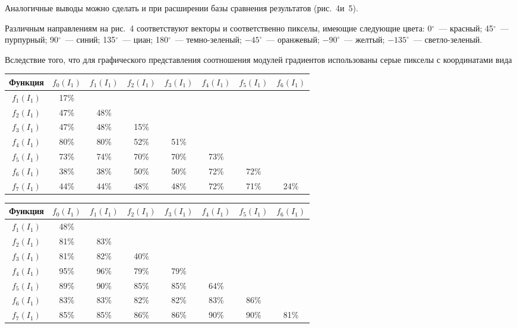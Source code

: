 \begin{multicols}{2}
  Аналогичные выводы можно сделать и при расширении базы сравнения
результатов (рис.~4\linebreak и~5).

  Различным направлениям на рис.~4 соответствуют векторы и соответственно
пикселы, имеющие следующие цвета: 0$^\circ$~--- красный; 45$^\circ$~---
пурпурный; 90$^\circ$~--- синий; 135$^\circ$~--- циан; 180$^\circ$~---
  тем\-но-зе\-ле\-ный; $-45^\circ$~--- оранжевый; $-90^\circ$~--- желтый; $-
135^\circ$~--- свет\-ло-зе\-леный.

  Вследствие того, что для графического пред\-став\-ле\-ния соотношения модулей
градиентов использованы серые пикселы с координатами вида

  \begin{table*}[b]\small %
  \begin{center}
  \vspace*{2ex}

  \begin{tabular}{|c|c|c|c|c|c|c|c|}
  \hline
\multicolumn{1}{|c|}{Функция}&$f_0(I_1)$&$f_1(I_1)$&$f_2(I_1)$&$f_3(I_1)$&$f_4(I_1)$&$f_5(I_1)$&$f_6(I_1)$\\
\hline
$f_1(I_1)$&17\%&&&&&&\\
$f_2(I_1)$&47\%&48\%&&&&&\\
$f_3(I_1)$&47\%&48\%&15\%&&&&\\
$f_4(I_1)$&80\%&80\%&52\%&51\%&&&\\
$f_5(I_1)$&73\%&74\%&70\%&70\%&73\%&&\\
$f_6(I_1)$&38\%&38\%&50\%&50\%&72\%&72\%&\\
$f_7(I_1)$&44\%&44\%&48\%&48\%&72\%&71\%&24\%\\
\hline
\end{tabular}
\end{center}
\end{table*}

  \begin{table*}\small %
  \begin{center}
  \vspace*{2ex}

  \begin{tabular}{|c|c|c|c|c|c|c|c|}
  \hline
\multicolumn{1}{|c|}{Функция}&$f_0(I_1)$&$f_1(I_1)$&$f_2(I_1)$&$f_3(I_1)$&$f_4(I_1)$&$f_5(I_1)$&$f_6(I_1)$\\
\hline
$f_1(I_1)$&48\%&&&&&&\\
$f_2(I_1)$&81\%&83\%&&&&&\\
$f_3(I_1)$&81\%&82\%&40\%&&&&\\
$f_4(I_1)$&95\%&96\%&79\%&79\%&&&\\
$f_5(I_1)$&89\%&90\%&85\%&85\%&64\%&&\\
$f_6(I_1)$&83\%&83\%&82\%&82\%&83\%&86\%&\\
$f_7(I_1)$&85\%&85\%&86\%&86\%&90\%&90\%&81\%\\
\hline
\end{tabular}
\end{center}
\end{table*}

\end{multicols}

